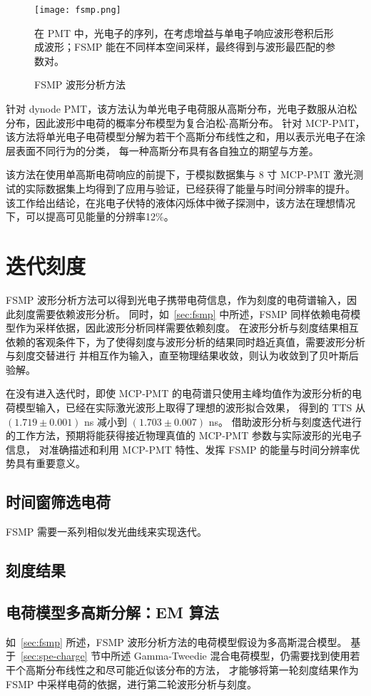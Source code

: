 \begin{figure}
    \centering
    \texttt{[image: fsmp.png]}
    \caption*{在 PMT 中，光电子的序列，在考虑增益与单电子响应波形卷积后形成波形；FSMP 能在不同样本空间采样，最终得到与波形最匹配的参数对。}
    \caption{FSMP 波形分析方法}
\end{figure}

针对 dynode PMT，该方法认为单光电子电荷服从高斯分布，光电子数服从泊松分布，因此波形中电荷的概率分布模型为复合泊松-高斯分布。
针对 MCP-PMT，该方法将单光电子电荷模型分解为若干个高斯分布线性之和，用以表示光电子在涂层表面不同行为的分类，
每一种高斯分布具有各自独立的期望与方差。

该方法在使用单高斯电荷响应的前提下，于模拟数据集与 8 寸 MCP-PMT 激光测试的实际数据集上均得到了应用与验证，已经获得了能量与时间分辨率的提升。
该工作给出结论，在兆电子伏特的液体闪烁体中微子探测中，该方法在理想情况下，可以提高可见能量的分辨率12\%。

\section{迭代刻度}
FSMP 波形分析方法可以得到光电子携带电荷信息，作为刻度的电荷谱输入，因此刻度需要依赖波形分析。
同时，如~\ref{sec:fsmp} 中所述，FSMP 同样依赖电荷模型作为采样依据，因此波形分析同样需要依赖刻度。
在波形分析与刻度结果相互依赖的客观条件下，为了使得刻度与波形分析的结果同时趋近真值，需要波形分析与刻度交替进行
并相互作为输入，直至物理结果收敛，则认为收敛到了贝叶斯后验解。

在没有进入迭代时，即使 MCP-PMT 的电荷谱只使用主峰均值作为波形分析的电荷模型输入，已经在实际激光波形上取得了理想的波形拟合效果，
得到的 TTS 从 $(1.719\pm0.001)$ ns 减小到 $(1.703\pm0.007)$ ns\cite{wangFastStochasticMatching2024a}。
借助波形分析与刻度迭代进行的工作方法，预期将能获得接近物理真值的 MCP-PMT 参数与实际波形的光电子信息，
对准确描述和利用 MCP-PMT 特性、发挥 FSMP 的能量与时间分辨率优势具有重要意义。

\subsection{时间窗筛选电荷}

FSMP 需要一系列相似发光曲线来实现迭代。

\subsection{刻度结果}

\subsection{电荷模型多高斯分解：EM 算法}\label{sec:em}
如~\ref{sec:fsmp} 所述，FSMP 波形分析方法的电荷模型假设为多高斯混合模型。
基于~\ref{sec:spe-charge} 节中所述 Gamma-Tweedie 混合电荷模型，仍需要找到使用若干个高斯分布线性之和尽可能近似该分布的方法，
才能够将第一轮刻度结果作为 FSMP 中采样电荷的依据，进行第二轮波形分析与刻度。

